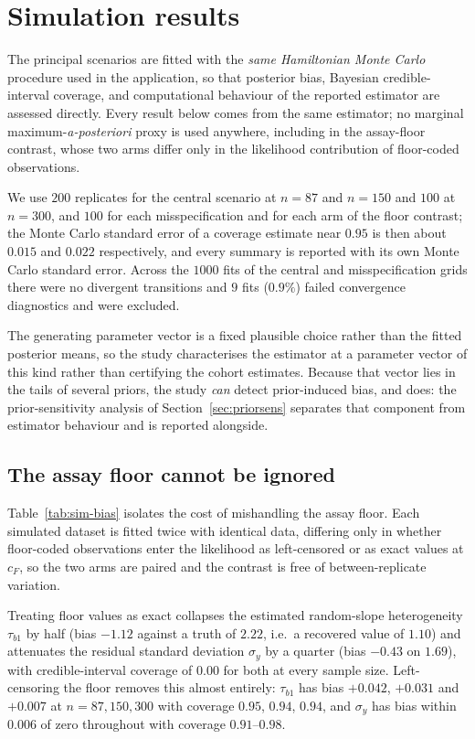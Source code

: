 \documentclass[11pt]{article}
\begin{document}
\section{Simulation results}
\label{sec:simresults}

The principal scenarios are fitted with the \emph{same Hamiltonian Monte Carlo}
procedure used in the application, so that posterior bias, Bayesian
credible-interval coverage, and computational behaviour of the reported
estimator are assessed directly. Every result below comes from the same
estimator; no marginal maximum-\emph{a-posteriori} proxy is used anywhere,
including in the assay-floor contrast, whose two arms differ only in the
likelihood contribution of floor-coded observations.

We use $200$ replicates for the central scenario at $n=87$ and $n=150$ and
$100$ at $n=300$, and $100$ for each misspecification and for each arm of the
floor contrast; the Monte Carlo standard error of a coverage estimate near
$0.95$ is then about $0.015$ and $0.022$ respectively, and every summary is
reported with its own Monte Carlo standard error. Across the $1000$ fits of the
central and misspecification grids there were no divergent transitions and $9$
fits ($0.9\%$) failed convergence diagnostics and were excluded.

The generating parameter vector is a fixed plausible choice rather than the
fitted posterior means, so the study characterises the estimator at a parameter
vector of this kind rather than certifying the cohort estimates. Because that
vector lies in the tails of several priors, the study \emph{can} detect
prior-induced bias, and does: the prior-sensitivity analysis of
Section~\ref{sec:priorsens} separates that component from estimator behaviour
and is reported alongside.

\subsection{The assay floor cannot be ignored}
\label{sec:sim:floor}

Table~\ref{tab:sim-bias} isolates the cost of mishandling the assay floor. Each
simulated dataset is fitted twice with identical data, differing only in whether
floor-coded observations enter the likelihood as left-censored or as exact
values at $c_F$, so the two arms are paired and the contrast is free of
between-replicate variation.

Treating floor values as exact collapses the estimated random-slope
heterogeneity $\tau_{b1}$ by half (bias $-1.12$ against a truth of $2.22$, i.e.\
a recovered value of $1.10$) and attenuates the residual standard deviation
$\sigma_y$ by a quarter (bias $-0.43$ on $1.69$), with credible-interval
coverage of $0.00$ for both at every sample size. Left-censoring the floor
removes this almost entirely: $\tau_{b1}$ has bias $+0.042$, $+0.031$ and
$+0.007$ at $n=87,150,300$ with coverage $0.95$, $0.94$, $0.94$, and $\sigma_y$
has bias within $0.006$ of zero throughout with coverage $0.91$--$0.98$.
\end{document}
